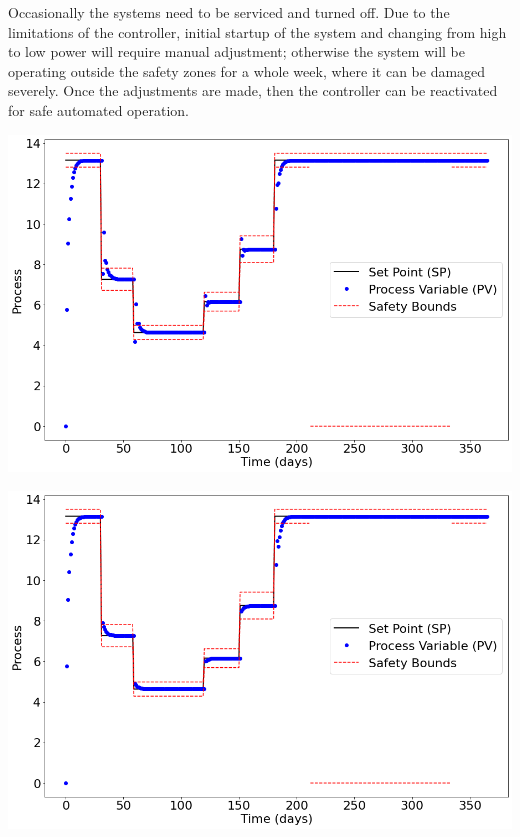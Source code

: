 \documentclass{article}
\begin{document}
\begin{multicols*}{2}
        Occasionally the systems need to be serviced and turned off.  Due to the limitations of the controller, initial startup of the system and changing from high to low power will require manual adjustment; otherwise the system will be operating outside the safety zones for a whole week, where it can be damaged severely.  Once the adjustments are made, then the controller can be reactivated for safe automated operation.

        \vspace{5mm}
        \noindent
        \begin{minipage}{0.49\textwidth}
            \includegraphics[width=\textwidth]{projectPID_untuned.png}
        \end{minipage}

        \noindent
        \begin{minipage}{0.49\textwidth}
            \includegraphics[width=\textwidth]{projectPID_tuned.png}
            \label{tunedCon}
        \end{minipage}


\end{multicols*}
\end{document}

